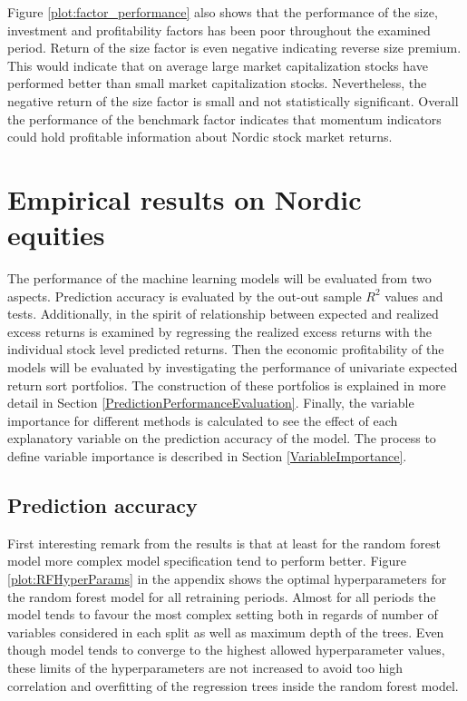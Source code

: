 \documentclass[12pt]{article}
\begin{document}
Figure \ref{plot:factor_performance} also shows that the performance of the size, investment and profitability factors has been poor throughout the examined period. Return of the size factor is even negative indicating reverse size premium. This would indicate that on average large market capitalization stocks have performed better than small market capitalization stocks. Nevertheless, the negative return of the size factor is small and not statistically significant. Overall the performance of the benchmark factor indicates that momentum indicators could hold profitable information about Nordic stock market returns. \par

\section{Empirical results on Nordic equities}

The performance of the machine learning models will be evaluated from two aspects. Prediction accuracy is evaluated by the out-out sample $R^2$ values and \citet{Diebold1995} tests. Additionally, in the spirit of \citet{Lewellen2015} relationship between expected and realized excess returns is examined by regressing the realized excess returns with the individual stock level predicted returns. Then the economic profitability of the models will be evaluated by investigating the performance of univariate expected return sort portfolios. The construction of these portfolios is explained in more detail in Section \ref{PredictionPerformanceEvaluation}. Finally, the variable importance for different methods is calculated to see the effect of each explanatory variable on the prediction accuracy of the model. The process to define variable importance is described in Section \ref{VariableImportance}. \par

\subsection{Prediction accuracy}\label{PredictionAccuracy}

First interesting remark from the results is that at least for the random forest model more complex model specification tend to perform better. Figure \ref{plot:RFHyperParams} in the appendix shows the optimal hyperparameters for the random forest model for all retraining periods. Almost for all periods the model tends to favour the most complex setting both in regards of number of variables considered in each split as well as maximum depth of the trees. Even though model tends to converge to the highest allowed hyperparameter values, these limits of the hyperparameters are not increased to avoid too high correlation and overfitting of the regression trees inside the random forest model. \par
\end{document}
